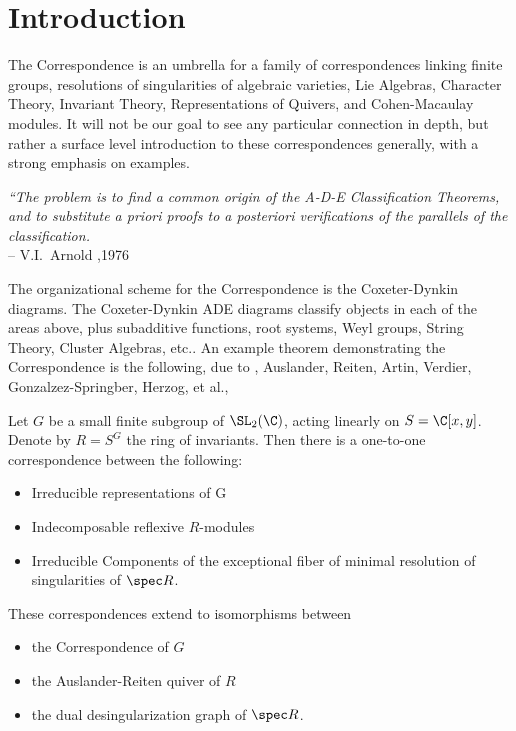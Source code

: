 \newpage
\section{Introduction}


The \mc Correspondence is an umbrella for a family of correspondences linking finite groups, resolutions of singularities of algebraic varieties, Lie Algebras, Character Theory, Invariant Theory, Representations of Quivers, and Cohen-Macaulay modules. It will not be our goal to see any particular connection in depth, but rather a surface level introduction to these correspondences generally, with a strong emphasis on examples. \\

        \begin{nscenter}
        \begin{minipage}{0.8\textwidth}
        {\itshape ``The problem is to find a common origin of the A-D-E Classification Theorems, and to substitute a priori proofs to a posteriori verifications of the parallels of the classification.} \\
        \phantom{x}\hspace{1cm} -- V.I.~Arnold ,1976 \\
        \end{minipage}
        \end{nscenter}

The organizational scheme for the \mc Correspondence is the Coxeter-Dynkin diagrams. The Coxeter-Dynkin ADE diagrams classify objects in each of the areas above, plus subadditive functions, root systems, Weyl groups, String Theory, Cluster Algebras, etc.. An example theorem demonstrating the \mc Correspondence is the following, due to \mc, Auslander, Reiten, Artin, Verdier, Gonzalzez-Springber, Herzog, et al.,


\begin{thm}
Let $G$ be a small finite subgroup of $\SL_2(\C)$, acting linearly on $S= \C[x,y]$. Denote by $R=S^G$ the ring of invariants. Then there is a one-to-one correspondence between the following:
	\begin{itemize}
	\item Irreducible representations of G
	\item Indecomposable reflexive $R$-modules
	\item Irreducible Components of the exceptional fiber of minimal resolution of singularities of $\spec R$.
	\end{itemize}
These correspondences extend to isomorphisms between 
	\begin{itemize}
	\item the \mc Correspondence of $G$
	\item the Auslander-Reiten quiver of $R$
	\item the dual desingularization graph of $\spec R$. 
	\end{itemize}
\end{thm}



